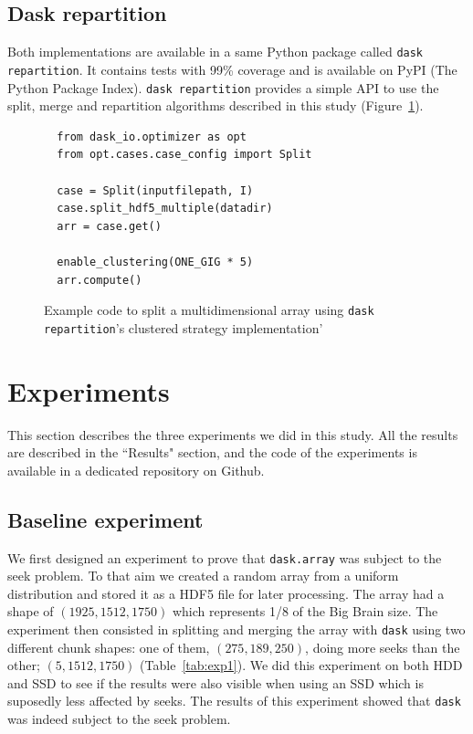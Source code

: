 \documentclass[conference]{IEEEtran}
\begin{document}
\subsection{Dask repartition}

Both implementations are available in a same Python package called \texttt{dask repartition}. It
contains tests with 99\% coverage and is available on PyPI (The Python Package
Index). \texttt{dask repartition} provides a simple API to use the split, merge and repartition
algorithms described in this study (Figure~\ref{fig:daskrepartition_split}).

\begin{figure}
  \begin{verbatim}
  from dask_io.optimizer as opt
  from opt.cases.case_config import Split

  case = Split(inputfilepath, I)
  case.split_hdf5_multiple(datadir)
  arr = case.get()

  enable_clustering(ONE_GIG * 5)
  arr.compute()
  \end{verbatim}
  \caption{Example code to split a multidimensional array using \texttt{dask repartition}'s clustered strategy implementation'}
  \label{fig:daskrepartition_split}
\end{figure}


\section{Experiments}
This section describes the three experiments we did in this study. All the
results are described in the ``Results" section, and the code of the experiments
is available in a dedicated repository on Github.

\subsection{Baseline experiment}
We first designed
an experiment to prove that \texttt{dask.array} was subject to the seek problem.
To that aim we created a random array from a uniform distribution and stored it
as a HDF5 file for later processing. The array had a shape of
$(1925, 1512, 1750)$ which represents 1/8
of the Big Brain size. The experiment then consisted in splitting and merging
the array with \texttt{dask} using two different chunk shapes: one of them,
$(275,189,250)$, doing more seeks than the other; $(5,1512,1750)$
(Table~\ref{tab:exp1}). We did this experiment on both HDD and SSD to see if the
results were also visible when using an SSD which is suposedly less affected by
seeks. The results of this experiment showed that \texttt{dask} was indeed
subject to the seek problem.
\end{document}
